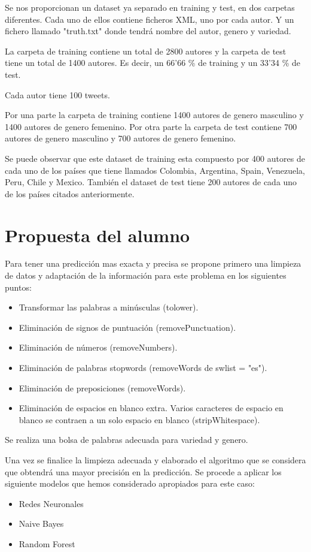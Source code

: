 \documentclass[11pt,a4paper]{article}
\begin{document}
  Se nos proporcionan un dataset ya separado en training y test, en dos carpetas diferentes. Cada uno de ellos contiene ficheros XML, uno por cada autor. Y un fichero llamado "truth.txt" donde tendr\'a nombre del autor, genero y variedad.

  La carpeta de training contiene un total de 2800 autores y la carpeta de test tiene un total de 1400 autores. Es decir, un 66'66 \% de training y un 33'34 \% de test.

  Cada autor tiene 100 tweets.

  Por una parte la carpeta de training contiene 1400 autores de genero masculino y 1400 autores de genero femenino. Por otra parte la carpeta de test contiene 700 autores de genero masculino y 700 autores de genero femenino.

  Se puede observar que este dataset de training esta compuesto por 400 autores de cada uno de los pa\'ises que tiene llamados Colombia, Argentina, Spain, Venezuela, Peru, Chile y Mexico. Tambi\'en el dataset de test tiene 200 autores de cada uno de los pa\'ises citados anteriormente.

\section{Propuesta del alumno}

  Para tener una predicci\'on mas exacta y precisa se propone primero una limpieza de datos y adaptaci\'on de la informaci\'on para este problema en los siguientes puntos:
  \begin{itemize}
  \item Transformar las palabras a min\'usculas (tolower).
  \item Eliminaci\'on de signos de puntuaci\'on (removePunctuation).
  \item Eliminaci\'on de n\'umeros (removeNumbers).
  \item Eliminaci\'on de palabras stopwords (removeWords de swlist = "es").
  \item Eliminaci\'on de preposiciones (removeWords).
  \item Eliminaci\'on de espacios en blanco extra. Varios caracteres de espacio en blanco se contraen a un solo espacio en blanco (stripWhitespace).
  \end{itemize}

Se realiza una bolsa de palabras adecuada para variedad y genero.

  Una vez se finalice la limpieza adecuada y elaborado el algoritmo que se considera que obtendr\'a una mayor precisi\'on en la predicci\'on. Se procede a aplicar los siguiente modelos que hemos considerado apropiados para este caso:
  \begin{itemize}
  \item Redes Neuronales
  \item Naive Bayes
  \item Random Forest
  \end{itemize}
\end{document}
